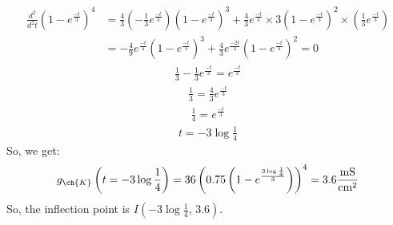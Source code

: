 \documentclass[11pt]{article}
\begin{document}
\begin{enumerate}[label=\arabic*.]
\begin{enumerate}[label=(\alph*)]
\begin{align*}
\frac{d^2} {d^2t} \left(1 - e^{\frac{-t} {3}}\right)^4 &= \frac{4} {3} \left(-\frac{1} {3} e^{\frac{-t} {3}}\right) \left(1 - e^{\frac{-t} {3}}\right)^3 + \frac{4} {3} e^{\frac{-t} {3}} \times 3 \left(1 - e^{\frac{-t} {3}}\right)^2 \times \left(\frac{1} {3} e^{\frac{-t} {3}}\right) \\
&= -\frac{4} {9} e^{\frac{-t} {3}} \left(1 - e^{\frac{-t} {3}}\right)^3 + \frac{4} {3} e^{\frac{-2t} {3}} \left(1 - e^{\frac{-t} {3}}\right)^2 = 0
\end{align*}
\begin{align*}
\frac{1} {3} - \frac{1} {3} e^{\frac{-t} {3}} = e^{\frac{-t} {3}}
\end{align*}
\begin{align*}
\frac{1} {3} = \frac{4} {3} e^{\frac{-t} {3}}
\end{align*}
\begin{align*}
\frac{1} {4} = e^{\frac{-t} {3}}
\end{align*}
\begin{align*}
t = -3 \log{\frac{1} {4}}
\end{align*}
So, we get:
\begin{align*}
g_{\ch{K}}\left(t = -3 \log{\frac{1} {4}}\right) = 36 \left(0.75 \left(1 - e^{\frac{3 \log{\frac{1} {4}}} {3}}\right)\right)^4 = 3.6 \frac{\text{mS}} {\text{cm}^2}
\end{align*}
So, the inflection point is $I\left(-3 \log{\frac{1} {4}} \text{, } 3.6\right)$.




\end{enumerate}
\end{enumerate}
\end{document}
